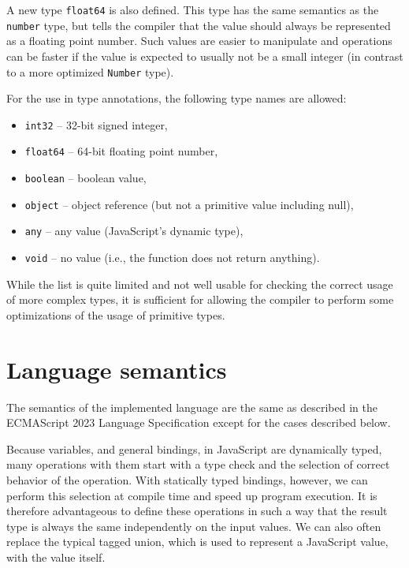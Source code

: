 A new type \texttt{float64} is also defined. This type has the same semantics as the \texttt{number} type, but tells the compiler that the value should always be represented as a floating point number. Such values are easier to manipulate and operations can be faster if the value is expected to usually not be a small integer (in contrast to a more optimized \texttt{Number} type).

For the use in type annotations, the following type names are allowed:
\begin{itemize}
    \item \texttt{int32} -- 32-bit signed integer,
    \item \texttt{float64} -- 64-bit floating point number,
    \item \texttt{boolean} -- boolean value,
    \item \texttt{object} -- object reference (but not a primitive value including null),
    \item \texttt{any} -- any value (JavaScript's dynamic type),
    \item \texttt{void} -- no value (i.e., the function does not return anything).
\end{itemize}

While the list is quite limited and not well usable for checking the correct usage of more complex types, it is sufficient for allowing the compiler to perform some optimizations of the usage of primitive types.



\section{Language semantics}\label{lang:semantics}

The semantics of the implemented language are the same as described in the ECMAScript 2023 Language Specification\cite{ecma262} except for the cases described below.

Because variables, and general bindings, in JavaScript are dynamically typed, many operations with them start with a type check and the selection of correct behavior of the operation. With statically typed bindings, however, we can perform this selection at compile time and speed up program execution. It is therefore advantageous to define these operations in such a way that the result type is always the same independently on the input values. We can also often replace the typical tagged union, which is used to represent a JavaScript value, with the value itself.

